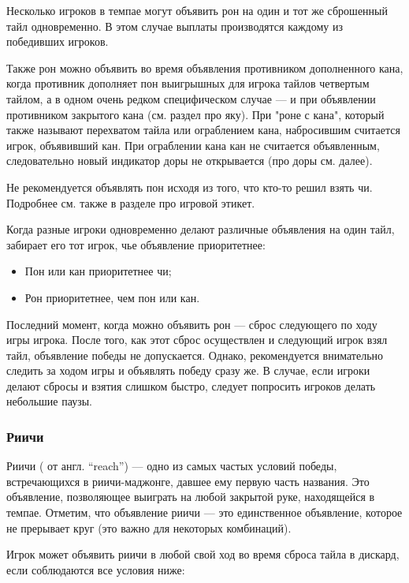 Несколько игроков в темпае могут объявить рон на один и тот же сброшенный тайл одновременно. В этом случае выплаты производятся каждому из победивших игроков. 

Также рон можно объявить во время объявления противником дополненного кана, когда противник дополняет пон выигрышных для игрока тайлов четвертым тайлом, а в одном очень редком специфическом случае --- и при объявлении противником закрытого кана (см. раздел про яку). При "роне с кана", который также называют перехватом тайла или ограблением кана, набросившим считается игрок, объявивший кан. При ограблении кана кан не считается объявленным, следовательно новый индикатор доры не открывается (про доры см. далее).

Не рекомендуется объявлять пон исходя из того, что кто-то решил взять чи. Подробнее см. также в разделе про игровой этикет.

Когда разные игроки одновременно делают различные объявления на один тайл, забирает его тот игрок, чье объявление приоритетнее:

\begin{itemize}
	\item Пон или кан приоритетнее чи;
	\item Рон приоритетнее, чем пон или кан.
\end{itemize}

Последний момент, когда можно объявить рон --- сброс следующего по ходу игры игрока. После того, как этот сброс осуществлен и следующий игрок взял тайл, объявление победы не допускается. Однако, рекомендуется внимательно следить за ходом игры и объявлять победу сразу же. В случае, если игроки делают сбросы и взятия слишком быстро, следует попросить игроков делать небольшие паузы.

\subsubsection{Риичи}

Риичи ( от англ. “reach”) --- одно из самых частых условий победы, встречающихся в риичи-маджонге, давшее ему первую часть названия. Это объявление, позволяющее выиграть на любой закрытой руке, находящейся в темпае. Отметим, что объявление риичи --- это единственное объявление, которое не прерывает круг (это важно для некоторых комбинаций).

Игрок может объявить риичи в любой свой ход во время сброса тайла в дискард, если соблюдаются все условия ниже:

